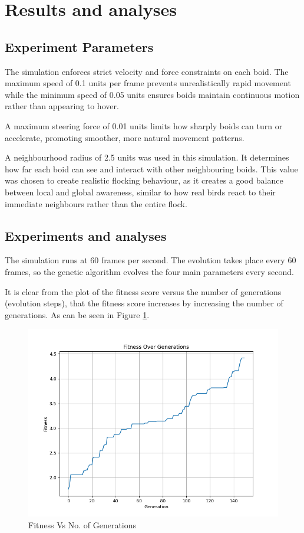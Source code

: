 \documentclass[twocolumn, a4paper, 12pt]{article}
\begin{document}
\section{Results and analyses}
\subsection{Experiment Parameters}
The simulation enforces strict velocity and force constraints on each boid. The maximum speed of 0.1 units per frame prevents unrealistically rapid movement while the minimum speed of 0.05 units ensures boids maintain continuous motion rather than appearing to hover.

A maximum steering force of 0.01 units limits how sharply boids can turn or accelerate, promoting smoother, more natural movement patterns.

A neighbourhood radius of 2.5 units was used in this simulation. It determines how far each boid can see and interact with other neighbouring boids. This value was chosen to create realistic flocking behaviour, as it creates a good balance between local and global awareness, similar to how real birds react to their immediate neighbours rather than the entire flock.

\subsection{Experiments and analyses}
The simulation runs at 60 frames per second. The evolution takes place every 60 frames, so the genetic algorithm evolves the four main parameters every second.

It is clear from the plot of the fitness score versus the number of generations (evolution steps), that the fitness score increases by increasing the number of generations. As can be seen in Figure \ref{fig:1}.

\begin{figure}[H]
    \centering
    \includegraphics[width=0.9\linewidth]{fitness_vs_generations.png}
    \caption{Fitness Vs No. of Generations}
    \label{fig:1}
\end{figure}
\end{document}
